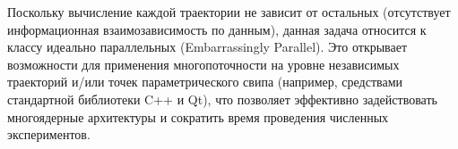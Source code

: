 Поскольку вычисление каждой траектории не зависит от остальных (отсутствует информационная взаимозависимость по данным), данная задача относится к классу идеально параллельных (Embarrassingly Parallel). Это открывает возможности для применения многопоточности на уровне независимых траекторий и/или точек параметрического свипа (например, средствами стандартной библиотеки C++ и Qt), что позволяет эффективно задействовать многоядерные архитектуры и сократить время проведения численных экспериментов.

